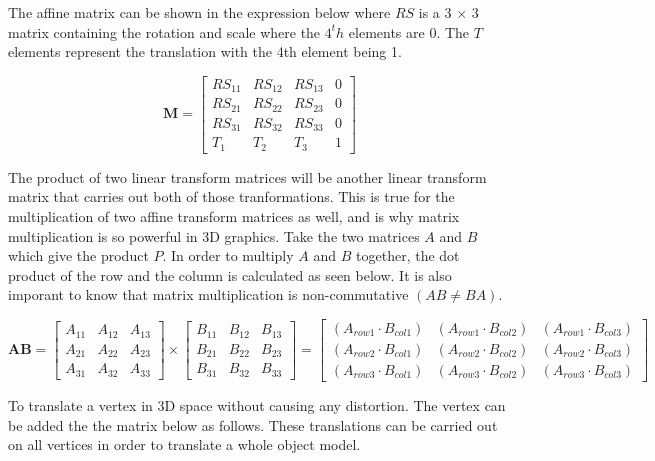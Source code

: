 \noindent
The affine matrix can be shown in the expression below where $RS$ is a 3 $\times$ 3 matrix containing the rotation and scale where the $4^th$ elements are 0. The $T$ elements represent the translation with the 4th element being 1. 

\begin{equation}
\textbf{M} = \begin{bmatrix}
RS_{11} & RS_{12} & RS_{13} & 0\\
RS_{21} & RS_{22} & RS_{23} & 0\\
RS_{31} & RS_{32} & RS_{33} & 0\\
T_{1} & T_{2} & T_{3} & 1
\end{bmatrix}
\end{equation}

The product of two linear transform matrices will be another linear transform matrix that carries out both of those tranformations. This is true for the multiplication of two affine transform matrices as well, and is why matrix multiplication is so powerful in 3D graphics. Take the two matrices $A$ and $B$ which give the product $P$. In order to multiply $A$ and $B$ together, the dot product of the row and the column is calculated as seen below. It is also imporant to know that matrix multiplication is non-commutative $(AB \not= BA)$.

\begin{equation}
\textbf{AB} = \begin{bmatrix}
A_{11} & A_{12} & A_{13}\\
A_{21} & A_{22} & A_{23}\\
A_{31} & A_{32} & A_{33}
\end{bmatrix}
\times
\begin{bmatrix}
B_{11} & B_{12} & B_{13}\\
B_{21} & B_{22} & B_{23}\\
B_{31} & B_{32} & B_{33}
\end{bmatrix}
= \begin{bmatrix}
(A_{row1} \cdot B_{col1}) & (A_{row1} \cdot B_{col2}) & (A_{row1} \cdot B_{col3})\\
(A_{row2} \cdot B_{col1}) & (A_{row2} \cdot B_{col2}) & (A_{row2} \cdot B_{col3})\\
(A_{row3} \cdot B_{col1}) & (A_{row3} \cdot B_{col2}) & (A_{row3} \cdot B_{col3})
\end{bmatrix}
\end{equation}

To translate a vertex in 3D space without causing any distortion. The vertex can be added the the matrix below as follows. These translations can be carried out on all vertices in order to translate a whole object model. 

